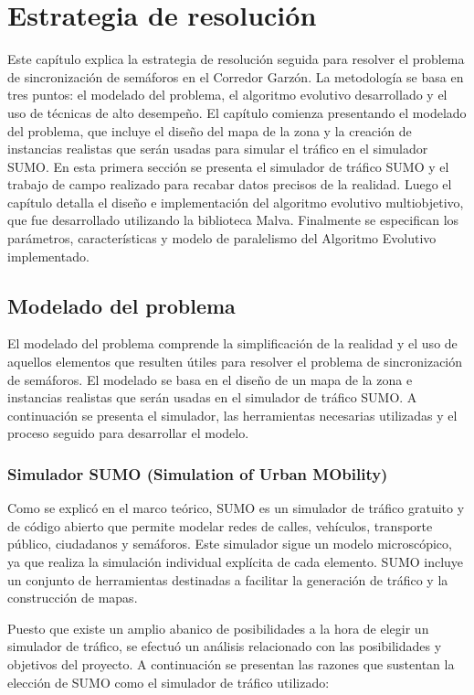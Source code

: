 \chapter{Estrategia de resolución}

Este capítulo explica la estrategia de resolución seguida para resolver el problema de sincronización de semáforos en el Corredor Garzón. La metodología se basa en tres puntos: el modelado del problema, el algoritmo evolutivo desarrollado y el uso de técnicas de alto desempeño. El capítulo comienza presentando el modelado del problema, que incluye el diseño del mapa de la zona y la creación de instancias realistas que serán usadas para simular el tráfico en el simulador SUMO. En esta primera sección se presenta el simulador de tráfico SUMO y el trabajo de campo realizado para recabar datos precisos de la realidad. Luego el capítulo detalla el diseño e implementación del algoritmo evolutivo multiobjetivo, que fue desarrollado utilizando la biblioteca Malva. Finalmente se especifican los parámetros, características y modelo de paralelismo del Algoritmo Evolutivo implementado.


\section{Modelado del problema }

El modelado del problema comprende la simplificación de la realidad y el uso de aquellos elementos que resulten útiles para resolver el problema de sincronización de semáforos. El modelado se basa en el diseño de un mapa de la zona e instancias realistas que serán usadas en el simulador de tráfico SUMO. A continuación se presenta el simulador, las herramientas necesarias utilizadas y el proceso seguido para desarrollar el modelo. 

\subsection{Simulador SUMO (Simulation of Urban MObility)}

Como se explicó en el marco teórico, SUMO es un simulador de tráfico gratuito y de código abierto que permite modelar redes de calles, vehículos, transporte público, ciudadanos y semáforos. Este simulador sigue un modelo microscópico, ya que realiza la simulación individual explícita de cada elemento. SUMO incluye un conjunto de herramientas destinadas a facilitar la generación de tráfico y la construcción de mapas. 

Puesto que existe un amplio abanico de posibilidades a la hora de elegir un simulador de tráfico, se efectuó un análisis relacionado con las posibilidades y objetivos del proyecto. A continuación se presentan las razones que sustentan la elección de SUMO como el simulador de tráfico utilizado:

